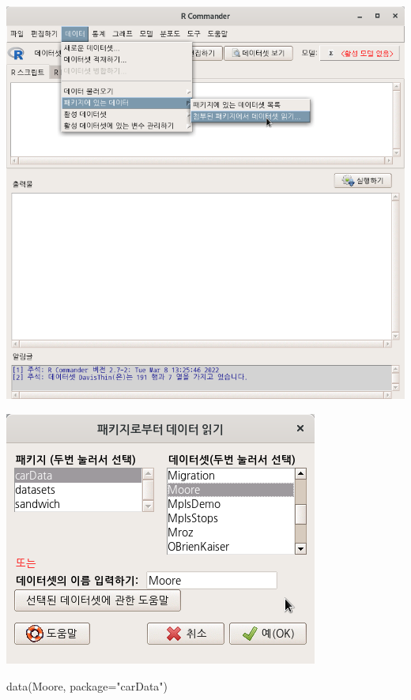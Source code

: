 \documentclass[
]{book}
\newenvironment{Shaded}{\begin{snugshade}}{\end{snugshade}}
\newcommand{\AttributeTok}[1]{\textcolor[rgb]{0.77,0.63,0.00}{#1}}
\newcommand{\FunctionTok}[1]{\textcolor[rgb]{0.00,0.00,0.00}{#1}}
\newcommand{\NormalTok}[1]{#1}
\newcommand{\StringTok}[1]{\textcolor[rgb]{0.31,0.60,0.02}{#1}}
\begin{document}
\includegraphics{fig/dataset-moore-01.png}

\includegraphics{fig/dataset-moore-02.png}

\begin{Shaded}
\begin{Highlighting}[]
\FunctionTok{data}\NormalTok{(Moore, }\AttributeTok{package=}\StringTok{"carData"}\NormalTok{)}
\end{Highlighting}
\end{Shaded}
\end{document}
